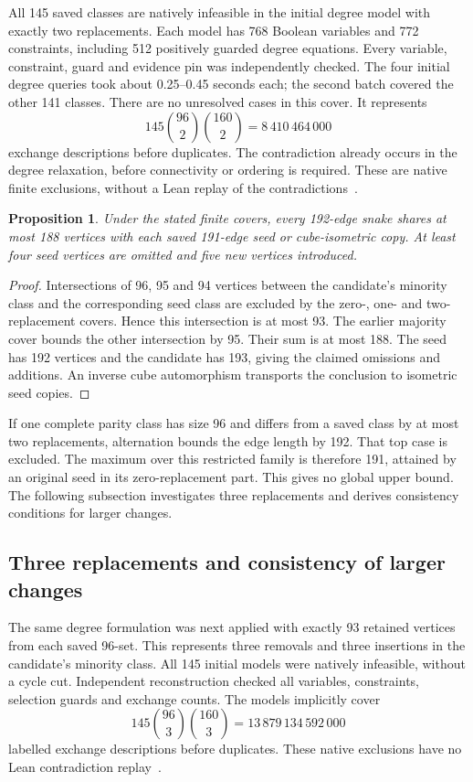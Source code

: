 \documentclass[11pt,a4paper]{article}
\newtheorem{proposition}[theorem]{Proposition}
\theoremstyle{definition}
\theoremstyle{remark}
\begin{document}
All 145 saved classes are natively infeasible in the initial degree
model with exactly two replacements. Each model has 768 Boolean
variables and 772 constraints, including 512 positively guarded degree
equations. Every variable, constraint, guard and evidence pin was
independently checked. The four initial degree queries took about
0.25--0.45 seconds each; the second batch covered the other 141 classes.
There are no unresolved cases in this cover. It represents
\[
145\binom{96}{2}\binom{160}{2}=8\,410\,464\,000
\]
exchange descriptions before duplicates. The contradiction already
occurs in the degree relaxation, before connectivity or ordering is
required. These are native finite exclusions, without a Lean replay
of the contradictions~\cite{research235}.

\begin{proposition}\label{prop:overlap235}
Under the stated finite covers, every 192-edge snake shares at most
188 vertices with each saved 191-edge seed or cube-isometric copy.
At least four seed vertices are omitted and five new vertices introduced.
\end{proposition}
\begin{proof}
Intersections of 96, 95 and 94 vertices between the candidate's minority
class and the corresponding seed class are excluded by the zero-, one-
and two-replacement covers. Hence this intersection is at most 93.
The earlier majority cover bounds the other intersection by 95. Their
sum is at most 188. The seed has 192 vertices and the candidate has 193,
giving the claimed omissions and additions. An inverse cube automorphism
transports the conclusion to isometric seed copies.
\end{proof}

If one complete parity class has size 96 and differs from a saved class
by at most two replacements, alternation bounds the edge length by 192.
That top case is excluded. The maximum over this restricted family is
therefore 191, attained by an original seed in its zero-replacement part.
This gives no global upper bound. The following subsection investigates three replacements and derives
consistency conditions for larger changes.

\subsection{Three replacements and consistency of larger changes}
\label{sec:exchange236}
The same degree formulation was next applied with exactly 93 retained
vertices from each saved 96-set. This represents three removals and three
insertions in the candidate's minority class. All 145 initial models
were natively infeasible, without a cycle cut. Independent reconstruction
checked all variables, constraints, selection guards and exchange counts.
The models implicitly cover
\[
145\binom{96}{3}\binom{160}{3}=13\,879\,134\,592\,000
\]
labelled exchange descriptions before duplicates. These native exclusions
have no Lean contradiction replay~\cite{research236}.
\end{document}
